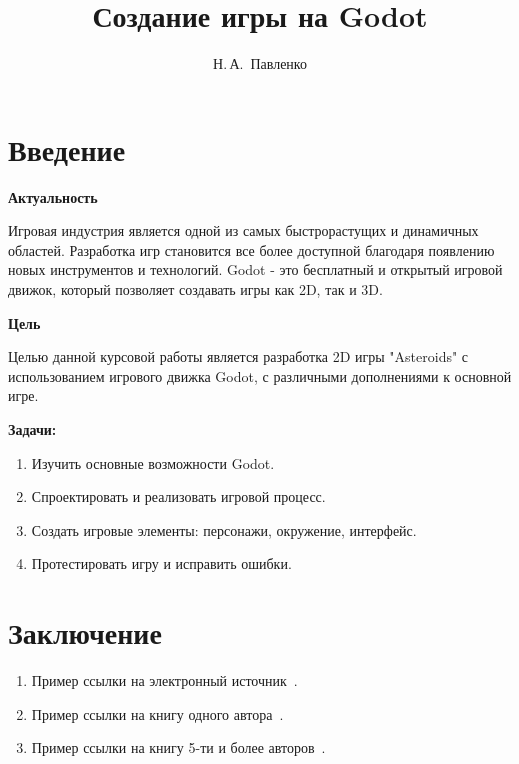 \documentclass[14pt, oneside]{altsu-report}
\title{Создание игры на Godot}
\author{Н.\,А.~Павленко}
\institute{Институт цифровых технологий, электроники и физики}
\date{\the\year}
\begin{document}
\maketitle

\setcounter{page}{2}
\makeabstract
\tableofcontents

\chapter*{Введение}

\textbf{Актуальность}
    
Игровая индустрия является одной из самых быстрорастущих и динамичных областей. Разработка игр становится все более доступной благодаря появлению новых инструментов и технологий. Godot - это бесплатный и открытый игровой движок, который позволяет создавать игры как 2D, так и 3D.

\textbf{Цель}

Целью данной курсовой работы является разработка 2D игры "Asteroids" с использованием игрового движка Godot, с различными дополнениями к основной игре.

\textbf{Задачи:}

\begin{enumerate}
\item Изучить основные возможности Godot.
\item Спроектировать и реализовать игровой процесс.
\item Создать игровые элементы: персонажи, окружение, интерфейс.
\item Протестировать игру и исправить ошибки.
\end{enumerate}





\chapter*{Заключение}

\begin{enumerate}
\item Пример ссылки на электронный источник~\cite{wikiRUBitbucket,wikiRUIdSoftware,wikiRUGitHub}.
\item Пример ссылки на книгу одного автора~\cite{book1author}.
\item Пример ссылки на книгу 5-ти и более авторов~\cite{book5author}.
\end{enumerate}
\end{document}
